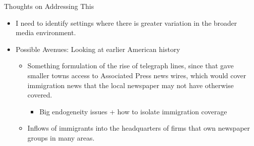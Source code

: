 \documentclass[12pt, aspectratio=169]{beamer}
\begin{document}
\begin{frame}{Thoughts on Addressing This}
    
    \begin{itemize}
        \item I need to identify settings where there is greater variation in 
            the broader
            media environment.
        \item Possible Avenues: Looking at earlier American history
            \begin{itemize}
                \item Something formulation of the rise of telegraph lines, 
                    since that gave smaller towns access to Associated Press news wires,
                    which would cover immigration news that the local newspaper 
                    may not have otherwise covered.
                    \begin{itemize}
                        \item Big endogeneity issues + how to isolate immigration coverage
                    \end{itemize}
                \item Inflows of immigrants into the headquarters of firms that own 
                    newspaper groups in many areas.
            \end{itemize}
    \end{itemize}

\end{frame}
\end{document}
